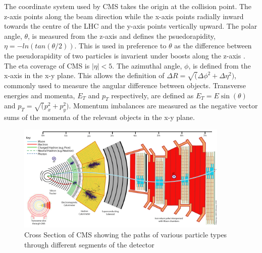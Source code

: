 The coordinate system used by CMS takes the origin at 
the collision point. The z-axis points along the beam direction while the x-axis points radially inward
towards the centre of the LHC and the y-axis points vertically upward.
The polar angle, $\theta$, is measured from the z-axis and defines the psuedorapidity, $\eta=-ln(tan(\theta/2))$. 
This is used in preference to $\theta$ as the difference between the pseudorapidity of two 
particles is invarient under boosts along the z-axis \cite{cms_iop}. 
The eta coverage of CMS is $|\eta|<5$. The azimuthal angle, $\phi$, is defined from the x-axis in the x-y plane.
This allows the definition of $\Delta R = \sqrt(\Delta\phi^2+\Delta\eta^2)$, commonly used to measure the 
angular difference between objects. Transverse energies and momenta, $E_T $ and $p_T$ respectively, are defined 
as $E_T = E\sin(\theta)$ and $p_T = \sqrt(p_{x}^2+p_{y}^2)$. Momentum imbalances are measured as the negative 
vector sums of the momenta of the relevant objects in the x-y plane. 

\begin{figure}
\centering
    \includegraphics[width=0.9\textwidth]{./Figures/detector/CMS_Slice.jpg}
  \caption{Cross Section of CMS showing the paths of various particle types 
  through different segments of the detector \cite{cmsslice}}
  \label{CMS_SLICE}
\end{figure}

